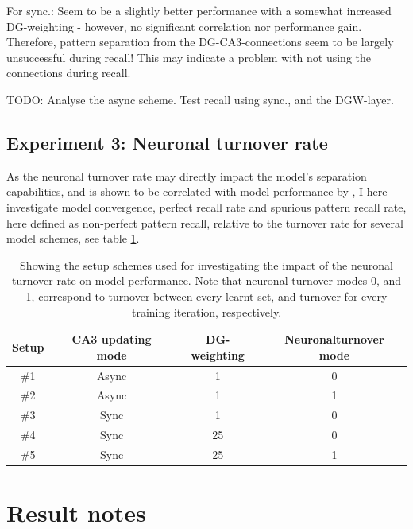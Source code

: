 For sync.: Seem to be a slightly better performance with a somewhat increased DG-weighting - however, no significant correlation nor performance gain. Therefore, pattern separation from the DG-CA3-connections seem to be largely unsuccessful during recall! This may indicate a problem with not using the connections during recall.

TODO: Analyse the async scheme. Test recall using sync., and the DGW-layer.


\subsection{Experiment 3: Neuronal turnover rate}

As the neuronal turnover rate may directly impact the model's separation capabilities, and is shown to be correlated with model performance by \citep{Hattori2014}, I here investigate model convergence, perfect recall rate and spurious pattern recall rate, here defined as non-perfect pattern recall, relative to the turnover rate for several model schemes, see table \ref{table:turnover_schemes}.

\begin{table}[]
\centering
\caption{Showing the setup schemes used for investigating the impact of the neuronal turnover rate on model performance. Note that neuronal turnover modes 0, and 1, correspond to turnover between every learnt set, and turnover for every training iteration, respectively.}
\label{table:turnover_schemes}
\begin{tabular}{|c|c|c|c|}
\hline
Setup & CA3 updating mode & DG-weighting & Neuronalturnover mode \\ \hline
\#1   & Async      & 1            & 0                     \\ \hline
\#2   & Async      & 1            & 1                     \\ \hline
\#3   & Sync       & 1            & 0                     \\ \hline
\#4   & Sync       & 25           & 0                     \\ \hline
\#5   & Sync       & 25           & 1                     \\ \hline
\end{tabular}
\end{table}




\section*{Result notes}

